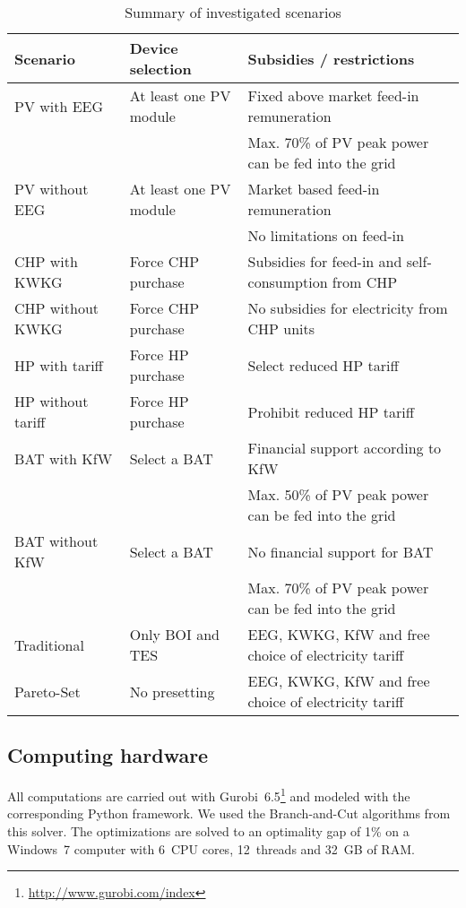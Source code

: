 \begin{table}[h!]
	\caption{Summary of investigated scenarios}
	\centering
	\begin{tabular}[l]{@{}lll}
		\hline
		Scenario 	& Device selection	& Subsidies / restrictions \\
		\hline
		PV with EEG & At least one PV module & Fixed above market feed-in remuneration\\
		& & Max. 70\% of PV peak power can be fed into the grid\\
		PV without EEG & At least one PV module & Market based feed-in remuneration\\
		& & No limitations on feed-in\\
		\hline
		CHP with KWKG & Force CHP purchase & Subsidies for feed-in and self-consumption from CHP\\
		CHP without KWKG & Force CHP purchase & No subsidies for electricity from CHP units\\
		\hline
		HP with tariff & Force HP purchase & Select reduced HP tariff\\
		HP without tariff & Force HP purchase & Prohibit reduced HP tariff\\
		\hline
		BAT with KfW & Select a BAT & Financial support according to KfW\\
		& & Max. 50\% of PV peak power can be fed into the grid\\
		BAT without KfW & Select a BAT & No financial support for BAT\\
		& & Max. 70\% of PV peak power can be fed into the grid\\
		\hline
		Traditional & Only BOI and TES & EEG, KWKG, KfW and free choice of electricity tariff \\
		Pareto-Set & No presetting &  EEG, KWKG, KfW and free choice of electricity tariff \\
		
	\end{tabular}
	\label{tab: scenarios setup}
\end{table}

\subsection{Computing hardware}

All computations are carried out with Gurobi~6.5\footnote{\url{http://www.gurobi.com/index}} and modeled with the corresponding Python framework.
We used the Branch-and-Cut \cite{Wolsey1998} algorithms from this solver.
The optimizations are solved to an optimality gap of 1\% on a Windows~7 computer with 6~CPU cores, 12~threads and 32~GB of RAM.

